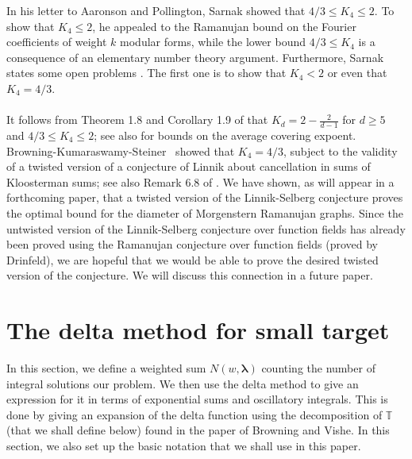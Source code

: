 \documentclass[11pt]{amsart}
\theoremstyle{plain}
\theoremstyle{plain}
\theoremstyle{remark}
\theoremstyle{definition}
\newcommand{\TT}{\mathbb{T}}
\begin{document}
In his letter \cite{Sarnak2} to  Aaronson and  Pollington, Sarnak showed that $4/3\leq K_4 \leq 2$. To show that $K_4\leq 2$, he appealed to the Ramanujan bound on the Fourier coefficients of weight $k$ modular forms, while the lower bound $4/3\leq K_4$ is a consequence of an elementary number theory argument. Furthermore, Sarnak states some open problems \cite[Page $24$]{Sarnak2}.  The first one is to show that  $K_4<2$ or  even that $K_4=4/3$.\\
\\
It follows from Theorem 1.8 and Corollary 1.9 of \cite{Naser2} that $K_d=2-\frac{2}{d-1}$ for $d\geq 5$ and $4/3\leq K_4 \leq 2$; see also \cite{Siegel} for bounds on the average covering expoent.  Browning-Kumaraswamy-Steiner~\cite{BKS} showed that $K_4 = 4/3$, subject to the validity of a twisted version of a conjecture of Linnik about cancellation in sums of Kloosterman sums; see also Remark 6.8 of \cite{Naser2}. We have shown, as will appear in a forthcoming paper, that a twisted version of the Linnik-Selberg conjecture proves the optimal bound for the diameter of Morgenstern Ramanujan graphs. Since the untwisted version of the Linnik-Selberg conjecture over function fields has already been proved using the Ramanujan conjecture over function fields (proved by Drinfeld), we are hopeful that we would be able to prove the desired twisted version of the conjecture. We will discuss this connection in a future paper.


\section{The delta method for small target}\label{deltamethod}
In this section, we define a weighted sum $N(w, \boldsymbol{\lambda})$ counting the number of integral solutions our problem. We then use the delta method to give an expression for it in terms of exponential sums and oscillatory integrals. This is done by giving an expansion of the delta function using the decomposition of $\TT$ (that we shall define below) found in the paper \cite{Browning} of Browning and Vishe. In this section, we also set up the basic notation that we shall use in this paper.
\end{document}
